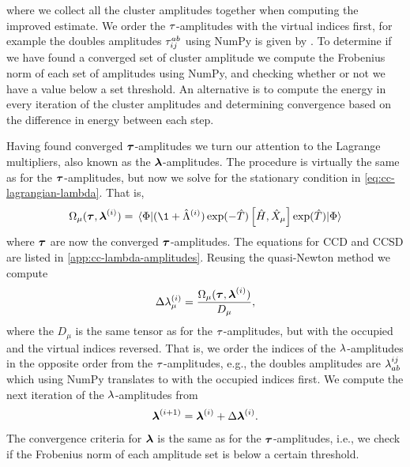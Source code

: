             where we collect all the cluster amplitudes together when computing
            the improved estimate.
            We order the $\tau$-amplitudes with the virtual indices first,
            for example the doubles amplitudes $\tau^{ab}_{ij}$ using NumPy
            is given by .
            To determine if we have found a converged set of cluster amplitude
            we compute the Frobenius norm of each set of amplitudes using
            NumPy, and checking whether or not we have a value below a set
            threshold.
            An alternative is to compute the energy in every iteration of the
            cluster amplitudes and determining convergence based on the
            difference in energy between each step.

            Having found converged $\boldsymbol{\tau}$-amplitudes we turn our
            attention to the Lagrange multipliers, also known as the
            $\boldsymbol{\lambda}$-amplitudes.
            The procedure is virtually the same as for the
            $\boldsymbol{\tau}$-amplitudes, but now we solve for the stationary
            condition in \autoref{eq:cc-lagrangian-lambda}.
            That is,
            \begin{align}
                \Omega_{\mu}(\vfg{\clustamp}, \vfg{\clustlamp}^{(i)})
                = \mel{\slat}{
                    (\1 + \clustl^{(i)})
                    \exponential(-\clust)
                    \com{\hamil}{\hat{X}_{\mu}}
                    \exponential(\clust)
                }{\slat}
            \end{align}
            where $\boldsymbol{\tau}$ are now the converged
            $\boldsymbol{\tau}$-amplitudes.
            The equations for CCD and CCSD are listed in
            \autoref{app:cc-lambda-amplitudes}.
            Reusing the quasi-Newton method we compute
            \begin{align}
                \Delta\lambda_{\mu}^{(i)}
                = \frac{
                    \Omega_{\mu}(\boldsymbol{\tau}, \boldsymbol{\lambda}^{(i)})
                }{
                    D_{\mu}
                },
            \end{align}
            where the $D_{\mu}$ is the same tensor as for the
            $\tau$-amplitudes, but with the occupied and the virtual
            indices reversed.
            That is, we order the indices of the $\lambda$-amplitudes
            in the opposite order from the $\tau$-amplitudes, e.g., the
            doubles amplitudes are $\lambda^{ij}_{ab}$ which using NumPy
            translates to  with the occupied indices
            first.
            We compute the next iteration of the $\lambda$-amplitudes from
            \begin{align}
                \boldsymbol{\lambda}^{(i + 1)}
                = \boldsymbol{\lambda}^{(i)}
                + \Delta\boldsymbol{\lambda}^{(i)}.
            \end{align}
            The convergence criteria for $\boldsymbol{\lambda}$ is the same as for
            the $\boldsymbol{\tau}$-amplitudes, i.e., we check if the Frobenius
            norm of each amplitude set is below a certain threshold.


